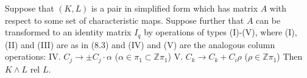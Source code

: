 Suppose that $(K, L)$ is a pair in simplified form which has matrix $A$ with respect to some set of characteristic maps. Suppose further that $A$ can be transformed to an identity matrix $I_q$ by operations of types (I)-(V), where (I), (II) and (III) are as in (8.3) and (IV) and (V) are the analogous column operations:
IV. $C_j \rightarrow \pm C_j \cdot \alpha$ ($\alpha \in \pi_1 \subset \mathbb{Z}\pi_1$)
V. $C_k \rightarrow C_k + C_i\rho$ ($\rho \in \mathbb{Z}\pi_1$)
Then $K \wedge L$ rel $L$.
